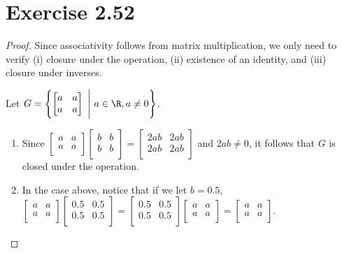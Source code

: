 \documentclass{article}
\begin{document}
\section*{Exercise 2.52}
\begin{proof}
    Since associativity follows from matrix multiplication, we only need to verify (i) closure under the operation, (ii) existence of an identity, and (iii) closure under inverses.

    Let \(G=\left\{\begin{bmatrix}
        a & a \\
        a & a
    \end{bmatrix}\ \Bigg{\vert}\ a\in\R, a\neq 0\right\}\).

    \begin{enumerate}[label=(\roman*)]
        \item Since \(
            \begin{bmatrix}
                a & a \\
                a & a \\
            \end{bmatrix}
            \begin{bmatrix}
                b & b \\
                b & b \\
            \end{bmatrix} =
            \begin{bmatrix}
                2ab & 2ab \\
                2ab & 2ab \\
            \end{bmatrix}\)
            and \(2ab\neq 0\), it follows that \(G\) is closed under the operation.
        \item In the case above, notice that if we let \(b=0.5\), \(
            \begin{bmatrix}
                a & a \\
                a & a \\
            \end{bmatrix}
            \begin{bmatrix}
                0.5 & 0.5 \\
                0.5 & 0.5 \\
            \end{bmatrix} =
            \begin{bmatrix}
                0.5 & 0.5 \\
                0.5 & 0.5 \\
            \end{bmatrix}
            \begin{bmatrix}
                a & a \\
                a & a \\
            \end{bmatrix} =
            \begin{bmatrix}
                a & a \\
                a & a \\
            \end{bmatrix}\).


\end{enumerate}
\end{proof}
\end{document}
